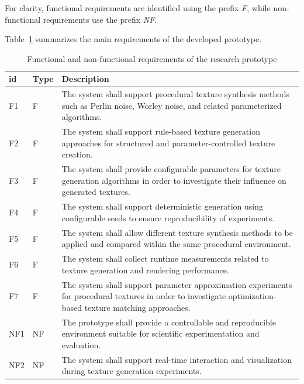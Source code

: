 For clarity, functional requirements are identified using the prefix \textit{F}, while non-functional requirements use the prefix \textit{NF}.

Table~\ref{tab:prototype-requirements} summarizes the main requirements of the developed prototype.

\begin{table}[H]
\centering
\caption{Functional and non-functional requirements of the research prototype}
\label{tab:prototype-requirements}
\begin{tabularx}{\textwidth}{|l|l|X|}
\hline
\textbf{id} & \textbf{Type} & \textbf{Description} \\
\hline
\hline

F1 & F &
The system shall support procedural texture synthesis methods such as Perlin noise, Worley noise, and related parameterized algorithms. \\
\hline

F2 & F &
The system shall support rule-based texture generation approaches for structured and parameter-controlled texture creation. \\
\hline

F3 & F &
The system shall provide configurable parameters for texture generation algorithms in order to investigate their influence on generated textures. \\
\hline

F4 & F &
The system shall support deterministic generation using configurable seeds to ensure reproducibility of experiments. \\
\hline

F5 & F &
The system shall allow different texture synthesis methods to be applied and compared within the same procedural environment. \\
\hline

F6 & F &
The system shall collect runtime measurements related to texture generation and rendering performance. \\
\hline

F7 & F &
The system shall support parameter approximation experiments for procedural textures in order to investigate optimization-based texture matching approaches. \\
\hline

NF1 & NF &
The prototype shall provide a controllable and reproducible environment suitable for scientific experimentation and evaluation. \\
\hline

NF2 & NF &
The system shall support real-time interaction and visualization during texture generation experiments. \\
\hline


\end{tabularx}
\end{table}
